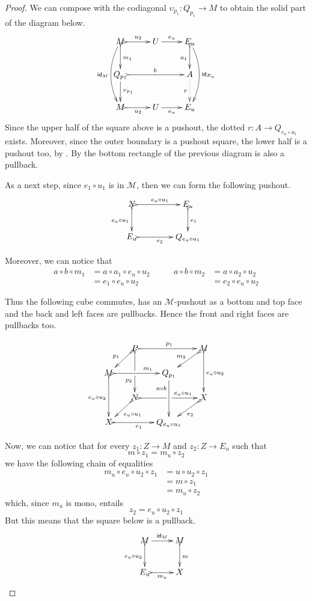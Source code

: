 \documentclass[a4paper]{article}
\newcommand{\id}[1]{\mathsf{id}_{#1}}
\def\X{\textbf {\textup{X}}}
\theoremstyle{definition}
\begin{document}
\begin{proof}
	We can compose with the codiagonal $\upsilon_{p_1}\colon Q_{p_1}\to M$ to obtain the solid part of the diagram below.
	\[\xymatrix{M \ar@/_.4cm/[dd]_{\id{M}}\ar@{>->}[r]^{u_2} \ar@{>->}[d]^{m_1} & U \ar[r]^-{e_u} & E_u \ar@{>->}[d]_{a_1} \ar@/^.4cm/[dd]^{\id{E_u}} \\
		Q_{p_1} \ar[d]^{\upsilon_{p_1}} \ar@{>->}[rr]^{b}&& A \ar@{.>}[d]_{r} \\ M\ar@{>->}[r]_{u_2} & U\ar[r]_-{e_u}&E_u}\]	
	Since the upper half of the square above is a pushout, the dotted $r\colon A\to Q_{e_u\circ u_1}$ exists. Moreover, since the outer boundary is a pushout square, the lower half is a pushout too, by . By  the bottom rectangle of the previous diagram is also a pullback.
	
	As a next step, since $e_1\circ u_1$ is in $\mathcal{M}$, then we can form the following pushout. 
	\[\xymatrix@C=40pt{N \ar@{>->}[r]^{e_u\circ u_1} \ar@{>->}[d]_{e_u\circ u_1}& E_u\ar@{>->}[d]^{e_1}\\
		E_u \ar@{>->}[r]_{e_2}& Q_{e_u\circ u_1} }\]
		
		Moreover, we can notice that
		\[\begin{split}
		a\circ b \circ m_1&=a\circ a_1\circ e_u\circ u_2\\&=e_1\circ e_u\circ u_2
		\end{split}\qquad \begin{split}
		a\circ b \circ m_2&=a\circ a_2\circ u_2\\&=e_2\circ e_u\circ u_2
		\end{split}\]
	
	Thus the following cube commutes, has an $\mathcal{M}$-pushout as a bottom and top face and the back and left faces are pullbacks. Hence the front and right faces are pullbacks too. 
	
	\[\xymatrix@C=15pt@R=15pt{&P\ar@{>->}[dd]|\hole_(.65){p_2}\ar@{>->}[rr]^{p_1} \ar@{>->}[dl]_{p_1} && M \ar@{>->}[dd]^{e_u\circ u_2} \ar@{>->}[dl]_{m_2}\\ M  \ar@{>->}[dd]_{e_u\circ u_2}\ar@{>->}[rr]^(.65){m_1} & & Q_{p_1}\ar[dd]_(.3){a\circ b}\\&N\ar@{>->}[rr]|\hole^(.7){e_u\circ u_1} \ar@{>->}[dl]^{e_u\circ u_1} && X \ar@{>->}[dl]^{e_2} \\X \ar@{>->}[rr]_{e_1} & & Q_{e_u\circ u_1}}\]
	
	Now, we can notice that for every $z_1\colon  Z\to M$ and $z_2\colon Z\to E_u$ such that 
	\[m\circ z_1=m_u\circ z_2\]
	we have the following chain of equalities
	\begin{align*}
		m_u\circ e_u\circ u_2\circ z_1&=u\circ u_2\circ z_1\\&=m\circ z_1\\&=m_u\circ z_2 
	\end{align*}
	which, since $m_u$ is mono, entails
	\[z_2=e_u\circ u_2\circ z_1\]
	But this means that the square below is a pullback. 
	\[\xymatrix{M \ar[r]^{\id{M}} \ar@{>->}[d]_{e_u\circ u_2}& M \ar@{>->}[d]^{m}\\ E_u \ar@{>->}[r]_{m_u} & X}\] 
	

\end{proof}
\end{document}

